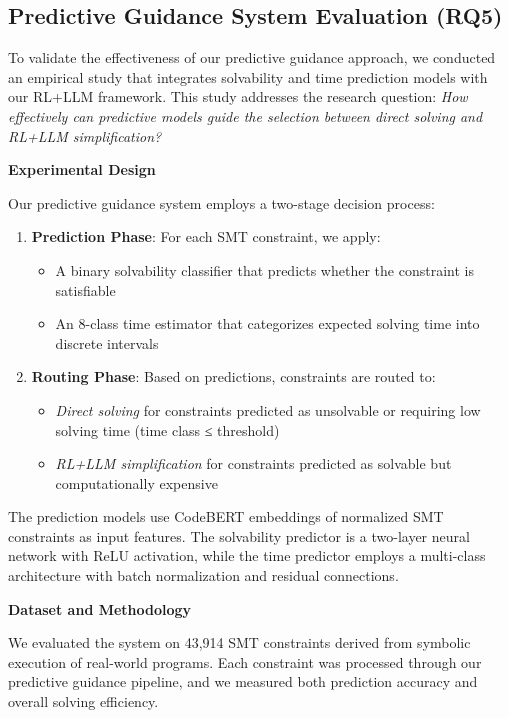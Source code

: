 
\subsection{Predictive Guidance System Evaluation (RQ5)}
\label{sec:predictive-guidance}

To validate the effectiveness of our predictive guidance approach, we conducted an empirical study that integrates solvability and time prediction models with our RL+LLM framework. This study addresses the research question: \textit{How effectively can predictive models guide the selection between direct solving and RL+LLM simplification?}

\textbf{Experimental Design}

Our predictive guidance system employs a two-stage decision process:
\begin{enumerate}
    \item \textbf{Prediction Phase}: For each SMT constraint, we apply:
    \begin{itemize}
        \item A binary solvability classifier that predicts whether the constraint is satisfiable
        \item An 8-class time estimator that categorizes expected solving time into discrete intervals
    \end{itemize}
    \item \textbf{Routing Phase}: Based on predictions, constraints are routed to:
    \begin{itemize}
        \item \textit{Direct solving} for constraints predicted as unsolvable or requiring low solving time (time class ≤ threshold)
        \item \textit{RL+LLM simplification} for constraints predicted as solvable but computationally expensive
    \end{itemize}
\end{enumerate}

The prediction models use CodeBERT embeddings of normalized SMT constraints as input features. The solvability predictor is a two-layer neural network with ReLU activation, while the time predictor employs a multi-class architecture with batch normalization and residual connections.

\textbf{Dataset and Methodology}

We evaluated the system on 43,914 SMT constraints derived from symbolic execution of real-world programs. Each constraint was processed through our predictive guidance pipeline, and we measured both prediction accuracy and overall solving efficiency.

